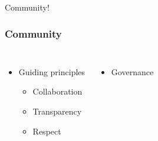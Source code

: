 \documentclass[aspectratio=169,11pt,hyperref={colorlinks=true}]{beamer}
\begin{document}
\begin{frame}[c]
  \begin{center}
      \color{white}
      \Huge Community!
  \end{center}
\end{frame}


\begin{frame}
  \frametitle{Community}
  \begin{columns}
    \begin{itemize}
      \item{Guiding principles}
      \begin{itemize}
          \item{Collaboration}
          \item{Transparency}
          \item{Respect}
      \end{itemize}
    \end{itemize}
    \begin{itemize}
        \item{Governance}
    \end{itemize}
  \end{columns}
\end{frame}

\end{document}
